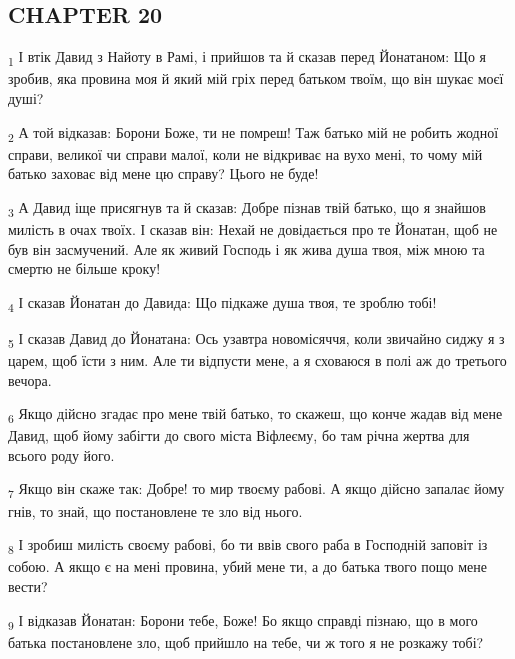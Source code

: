 \subsection{CHAPTER 20}
\begin{tcolorbox}
\textsubscript{1} І втік Давид з Найоту в Рамі, і прийшов та й сказав перед Йонатаном: Що я зробив, яка провина моя й який мій гріх перед батьком твоїм, що він шукає моєї душі?
\end{tcolorbox}
\begin{tcolorbox}
\textsubscript{2} А той відказав: Борони Боже, ти не помреш! Таж батько мій не робить жодної справи, великої чи справи малої, коли не відкриває на вухо мені, то чому мій батько заховає від мене цю справу? Цього не буде!
\end{tcolorbox}
\begin{tcolorbox}
\textsubscript{3} А Давид іще присягнув та й сказав: Добре пізнав твій батько, що я знайшов милість в очах твоїх. І сказав він: Нехай не довідається про те Йонатан, щоб не був він засмучений. Але як живий Господь і як жива душа твоя, між мною та смертю не більше кроку!
\end{tcolorbox}
\begin{tcolorbox}
\textsubscript{4} І сказав Йонатан до Давида: Що підкаже душа твоя, те зроблю тобі!
\end{tcolorbox}
\begin{tcolorbox}
\textsubscript{5} І сказав Давид до Йонатана: Ось узавтра новомісяччя, коли звичайно сиджу я з царем, щоб їсти з ним. Але ти відпусти мене, а я сховаюся в полі аж до третього вечора.
\end{tcolorbox}
\begin{tcolorbox}
\textsubscript{6} Якщо дійсно згадає про мене твій батько, то скажеш, що конче жадав від мене Давид, щоб йому забігти до свого міста Віфлеєму, бо там річна жертва для всього роду його.
\end{tcolorbox}
\begin{tcolorbox}
\textsubscript{7} Якщо він скаже так: Добре! то мир твоєму рабові. А якщо дійсно запалає йому гнів, то знай, що постановлене те зло від нього.
\end{tcolorbox}
\begin{tcolorbox}
\textsubscript{8} І зробиш милість своєму рабові, бо ти ввів свого раба в Господній заповіт із собою. А якщо є на мені провина, убий мене ти, а до батька твого пощо мене вести?
\end{tcolorbox}
\begin{tcolorbox}
\textsubscript{9} І відказав Йонатан: Борони тебе, Боже! Бо якщо справді пізнаю, що в мого батька постановлене зло, щоб прийшло на тебе, чи ж того я не розкажу тобі?
\end{tcolorbox}

